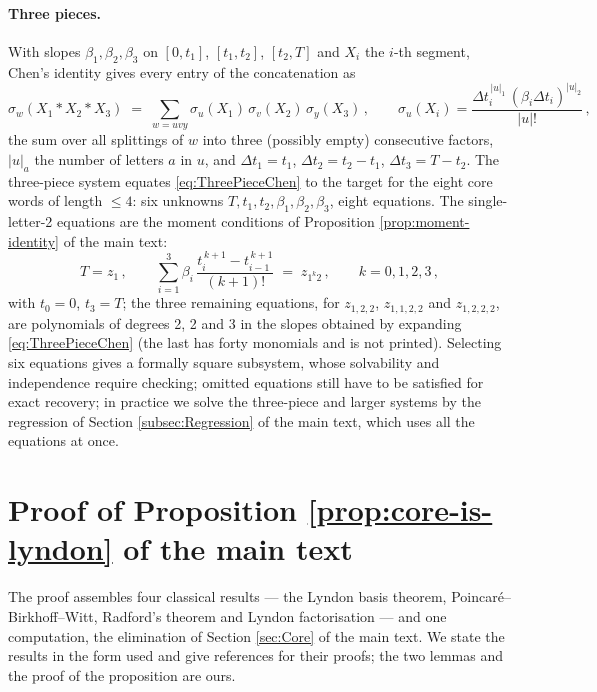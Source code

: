 \documentclass[11pt,english]{article}
\theoremstyle{definition}
\theoremstyle{remark}
\begin{document}
\paragraph{Three pieces.}
With slopes $\beta_{1},\beta_{2},\beta_{3}$ on $[0,t_{1}]$, $[t_{1},t_{2}]$,
$[t_{2},T]$ and $X_{i}$ the $i$-th segment, Chen's identity gives every
entry of the concatenation as
\begin{equation}
\sigma_{w}(X_{1}*X_{2}*X_{3})\;=\;\sum_{w=uvy}\sigma_{u}(X_{1})\,\sigma_{v}(X_{2})\,\sigma_{y}(X_{3})\,,\qquad
\sigma_{u}(X_{i})=\frac{\Delta t_{i}^{\,|u|_{1}}\,(\beta_{i}\Delta t_{i})^{|u|_{2}}}{|u|!}\,,\label{eq:ThreePieceChen}
\end{equation}
the sum over all splittings of $w$ into three (possibly empty)
consecutive factors, $|u|_{a}$ the number of letters $a$ in $u$, and
$\Delta t_{1}=t_{1}$, $\Delta t_{2}=t_{2}-t_{1}$, $\Delta t_{3}=T-t_{2}$.
The three-piece system equates \eqref{eq:ThreePieceChen} to the target
for the eight core words of length $\leq4$: six unknowns
$T,t_{1},t_{2},\beta_{1},\beta_{2},\beta_{3}$, eight equations. The
single-letter-2 equations are the moment conditions of Proposition
\ref{prop:moment-identity} of the main text:
\[
T=z_{1}\,,\qquad
\sum_{i=1}^{3}\beta_{i}\,\frac{t_{i}^{\,k+1}-t_{i-1}^{\,k+1}}{(k+1)!}\;=\;z_{1^{k}2}\,,\qquad k=0,1,2,3\,,
\]
with $t_{0}=0$, $t_{3}=T$; the three remaining equations, for
$z_{1,2,2}$, $z_{1,1,2,2}$ and $z_{1,2,2,2}$, are polynomials of
degrees 2, 2 and 3 in the slopes obtained by expanding
\eqref{eq:ThreePieceChen} (the last has forty monomials and is not
printed). Selecting six equations gives a formally square subsystem,
whose solvability and independence require checking; omitted equations
still have to be satisfied for exact recovery; in practice we solve the three-piece and larger
systems by the regression of Section \ref{subsec:Regression} of the main text, which
uses all the equations at once.


\section{Proof of Proposition \ref{prop:core-is-lyndon} of the main text\label{app:Proof}}

The proof assembles four classical results --- the Lyndon basis
theorem, Poincaré--Birkhoff--Witt, Radford's theorem and Lyndon
factorisation --- and one computation, the elimination of Section
\ref{sec:Core} of the main text. We state the results in the form used and give
references for their proofs; the two lemmas and the proof of the
proposition are ours.
\end{document}
